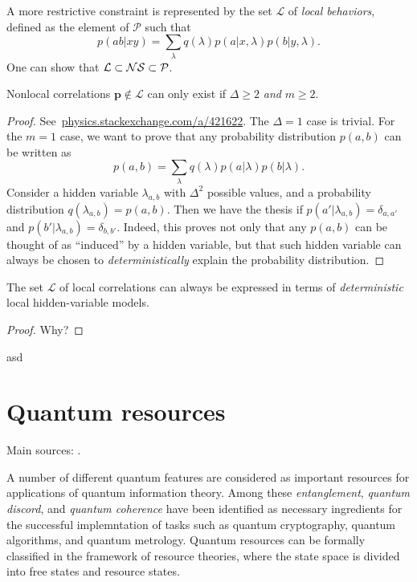 \documentclass[a4paper]{report}
\begin{document}
A more restrictive constraint is represented by the set $\mathcal L$ of \emph{local behaviors}, defined as the element of $\mathcal P$ such that
\begin{equation}
    p(ab|xy)=\sum_\lambda q(\lambda) p(a|x,\lambda)p(b|y,\lambda).
\end{equation}
One can show that $\mathcal L\subset \mathcal{N}\mathcal{S}\subset \mathcal P$.
\begin{prop}
    Nonlocal correlations $\mathbf p\notin \mathcal L$ can only exist if $\Delta\ge2$ \emph{and} $m\ge2$.
\end{prop}
\begin{proof}
    See~\href{https://physics.stackexchange.com/a/421622/58382}{physics.stackexchange.com/a/421622}.
    The $\Delta=1$ case is trivial. For the $m=1$ case, we want to prove that any probability distribution $p(a,b)$ can be written as
    \begin{equation}
        p(a,b)=\sum_\lambda q(\lambda)p(a|\lambda)p(b|\lambda).
    \end{equation}
    Consider a hidden variable $\lambda_{a,b}$ with $\Delta^2$ possible values, and a probability distribution $q(\lambda_{a,b})=p(a,b)$.
    Then we have the thesis if $p(a'|\lambda_{a,b})=\delta_{a,a'}$ and $p(b'|\lambda_{a,b})=\delta_{b,b'}$.
    Indeed, this proves not only that any $p(a,b)$ can be thought of as ``induced'' by a hidden variable, but that such hidden variable can always be chosen to \emph{deterministically} explain the probability distribution.
\end{proof}

\begin{prop}
    The set $\mathcal L$ of local correlations can always be expressed in terms of \emph{deterministic} local hidden-variable models.
\end{prop}
\begin{proof}
    \large{\color{red}Why?}
\end{proof}

\begin{prop}
    asd
\end{prop}


\chapter{Quantum resources}

Main sources: \cite{streltsov2016maximal}.

A number of different quantum features are considered as important resources for applications of quantum information theory.
Among these \emph{entanglement}, \emph{quantum discord}, and \emph{quantum coherence} have been identified as necessary ingredients for the successful implemntation of tasks such as quantum cryptography, quantum algorithms, and quantum metrology.
Quantum resources can be formally classified in the framework of resource theories,
where the state space is divided into free states and resource states.
\end{document}
